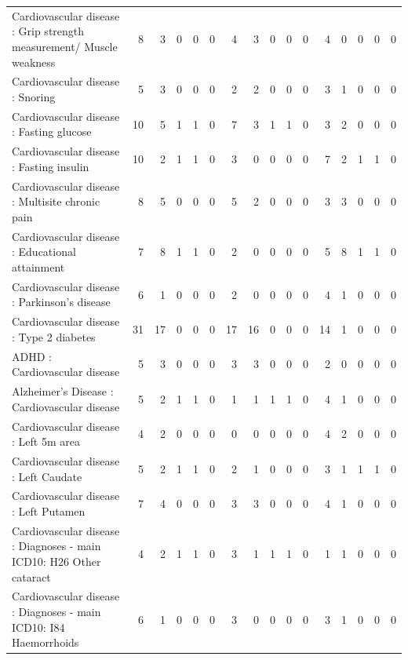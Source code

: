 \begin{table}[ht]
\begin{tabular}{lrrrrrrrrrrrrrrr}
  Cardiovascular disease : Grip strength measurement/ Muscle weakness &   8 &   3 &   0 &   0 &   0 &   4 &   3 &   0 &   0 &   0 &   4 &   0 &   0 &   0 &   0 \\ 
  Cardiovascular disease : Snoring &   5 &   3 &   0 &   0 &   0 &   2 &   2 &   0 &   0 &   0 &   3 &   1 &   0 &   0 &   0 \\ 
  Cardiovascular disease : Fasting glucose &  10 &   5 &   1 &   1 &   0 &   7 &   3 &   1 &   1 &   0 &   3 &   2 &   0 &   0 &   0 \\ 
  Cardiovascular disease : Fasting insulin &  10 &   2 &   1 &   1 &   0 &   3 &   0 &   0 &   0 &   0 &   7 &   2 &   1 &   1 &   0 \\ 
  Cardiovascular disease : Multisite chronic pain &   8 &   5 &   0 &   0 &   0 &   5 &   2 &   0 &   0 &   0 &   3 &   3 &   0 &   0 &   0 \\ 
  Cardiovascular disease : Educational attainment &   7 &   8 &   1 &   1 &   0 &   2 &   0 &   0 &   0 &   0 &   5 &   8 &   1 &   1 &   0 \\ 
  Cardiovascular disease : Parkinson's disease &   6 &   1 &   0 &   0 &   0 &   2 &   0 &   0 &   0 &   0 &   4 &   1 &   0 &   0 &   0 \\ 
  Cardiovascular disease : Type 2 diabetes &  31 &  17 &   0 &   0 &   0 &  17 &  16 &   0 &   0 &   0 &  14 &   1 &   0 &   0 &   0 \\ 
  ADHD : Cardiovascular disease &   5 &   3 &   0 &   0 &   0 &   3 &   3 &   0 &   0 &   0 &   2 &   0 &   0 &   0 &   0 \\ 
  Alzheimer's Disease : Cardiovascular disease &   5 &   2 &   1 &   1 &   0 &   1 &   1 &   1 &   1 &   0 &   4 &   1 &   0 &   0 &   0 \\ 
  Cardiovascular disease : Left 5m area &   4 &   2 &   0 &   0 &   0 &   0 &   0 &   0 &   0 &   0 &   4 &   2 &   0 &   0 &   0 \\ 
  Cardiovascular disease : Left Caudate &   5 &   2 &   1 &   1 &   0 &   2 &   1 &   0 &   0 &   0 &   3 &   1 &   1 &   1 &   0 \\ 
  Cardiovascular disease : Left Putamen &   7 &   4 &   0 &   0 &   0 &   3 &   3 &   0 &   0 &   0 &   4 &   1 &   0 &   0 &   0 \\ 
  Cardiovascular disease : Diagnoses - main ICD10: H26 Other cataract &   4 &   2 &   1 &   1 &   0 &   3 &   1 &   1 &   1 &   0 &   1 &   1 &   0 &   0 &   0 \\ 
  Cardiovascular disease : Diagnoses - main ICD10: I84 Haemorrhoids &   6 &   1 &   0 &   0 &   0 &   3 &   0 &   0 &   0 &   0 &   3 &   1 &   0 &   0 &   0 \\ 

\end{tabular}
\end{table}
